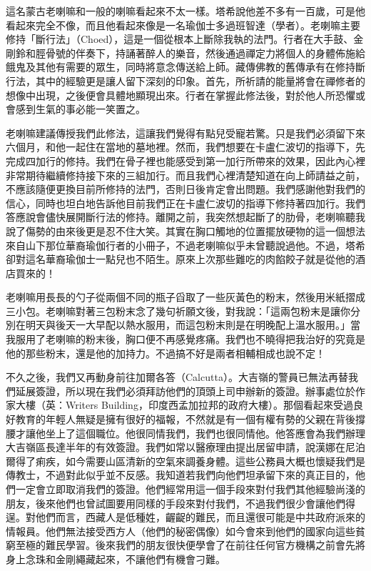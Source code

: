 這名蒙古老喇嘛和一般的喇嘛看起來不太一樣。塔希說他差不多有一百歲，可是他看起來完全不像，而且他看起來像是一名瑜伽士多過班智達（學者）。老喇嘛主要修持「斷行法」（Choed），這是一個從根本上斷除我執的法門。行者在大手鼓、金剛鈴和脛骨號的伴奏下，持誦著醉人的樂音，然後通過禪定力將個人的身體佈施給餓鬼及其他有需要的眾生，同時將意念傳送給上師。藏傳佛教的舊傳承有在修持斷行法，其中的經驗更是讓人留下深刻的印象。首先，所祈請的能量將會在禪修者的想像中出現，之後便會具體地顯現出來。行者在掌握此修法後，對於他人所恐懼或會感到生氣的事必能一笑置之。

老喇嘛建議傳授我們此修法，這讓我們覺得有點兒受寵若驚。只是我們必須留下來六個月，和他一起住在當地的墓地裡。然而，我們想要在卡盧仁波切的指導下，先完成四加行的修持。我們在骨子裡也能感受到第一加行所帶來的效果，因此內心裡非常期待繼續修持接下來的三組加行。而且我們心裡清楚知道在向上師請益之前，不應該隨便更換目前所修持的法門，否則日後肯定會出問題。我們感謝他對我們的信心，同時也坦白地告訴他目前我們正在卡盧仁波切的指導下修持著四加行。我們答應說會儘快展開斷行法的修持。離開之前，我突然想起斷了的肋骨，老喇嘛聽我說了傷勢的由來後更是忍不住大笑。其實在胸口觸地的位置擺放硬物的這一個想法來自山下那位華裔瑜伽行者的小冊子，不過老喇嘛似乎未曾聽說過他。不過，塔希卻對這名華裔瑜伽士一點兒也不陌生。原來上次那些難吃的肉餡餃子就是從他的酒店買來的！

老喇嘛用長長的勺子從兩個不同的瓶子舀取了一些灰黃色的粉末，然後用米紙摺成三小包。老喇嘛對著三包粉末念了幾句祈願文後，對我說：「這兩包粉末是讓你分別在明天與後天一大早配以熱水服用，而這包粉末則是在明晚配上溫水服用。」當我服用了老喇嘛的粉末後，胸口便不再感覺疼痛。我們也不曉得把我治好的究竟是他的那些粉末，還是他的加持力。不過搞不好是兩者相輔相成也說不定！

不久之後，我們又再動身前往加爾各答（Calcutta）。大吉嶺的警員已無法再替我們延展簽證，所以現在我們必須拜訪他們的頂頭上司申辦新的簽證。辦事處位於作家大樓（英：Writers
Building，印度西孟加拉邦的政府大樓）。那個看起來受過良好教育的年輕人無疑是擁有很好的福報，不然就是有一個有權有勢的父親在背後撐腰才讓他坐上了這個職位。他很同情我們，我們也很同情他。他答應會為我們辦理大吉嶺區長達半年的有效簽證。我們如常以醫療理由提出居留申請，說漢娜在尼泊爾得了痢疾，如今需要山區清新的空氣來調養身體。這些公務員大概也懷疑我們是傳教士，不過對此似乎並不反感。我知道若我們向他們坦承留下來的真正目的，他們一定會立即取消我們的簽證。他們經常用這一個手段來對付我們其他經驗尚淺的朋友，後來他們也曾試圖要用同樣的手段來對付我們，不過我們很少會讓他們得逞。對他們而言，西藏人是低種姓，齷齪的難民，而且還很可能是中共政府派來的情報員。他們無法接受西方人（他們的秘密偶像）如今會來到他們的國家向這些貧窮至極的難民學習。後來我們的朋友很快便學會了在前往任何官方機構之前會先將身上念珠和金剛繩藏起來，不讓他們有機會刁難。

